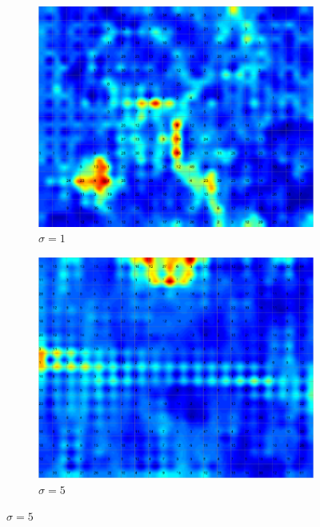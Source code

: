 \documentclass{acm_proc_article-sp}
\begin{document}
\begin{figure}
\centering
    \centering
    \begin{subfigure}[b]{0.30\linewidth}
        \includegraphics[width=\linewidth]{img/wine-newmid-u-matrix-sigma-1}
        \caption{$\sigma=1$}
        \label{fig:wine-newmid-u-matrix-sigma-1}
    \end{subfigure}
    \begin{subfigure}[b]{0.30\linewidth}
        \includegraphics[width=\linewidth]{img/wine-newmid-u-matrix-sigma-5}
        \caption{$\sigma=5$}
        \label{fig:wine-newmid-u-matrix-sigma-5}
    \end{subfigure}

\end{figure}
\end{document}
